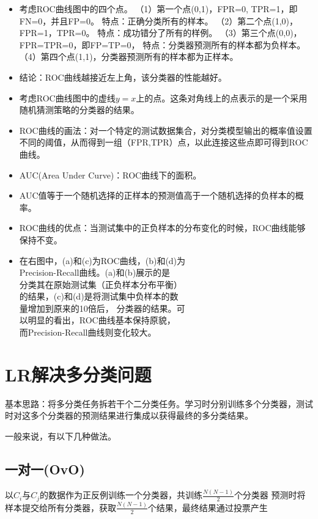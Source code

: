 \documentclass[10pt,a4paper]{ctexbook}
\begin{document}
\begin{itemize}

\item 考虑ROC曲线图中的四个点。
    \subitem（1）第一个点(0,1)，FPR=0, TPR=1，即FN=0，并且FP=0。
        \subsubitem 特点：正确分类所有的样本。
    \subitem（2）第二个点(1,0)，FPR=1，TPR=0。
        \subsubitem 特点：成功错分了所有的样例。
    \subitem（3）第三个点(0,0)，FPR=TPR=0，即FP=TP=0，
        \subsubitem 特点：分类器预测所有的样本都为负样本。
    \subitem（4）第四个点(1,1)，分类器预测所有的样本都为正样本。
\item 结论：ROC曲线越接近左上角，该分类器的性能越好。
\item 考虑ROC曲线图中的虚线$y=x$上的点。这条对角线上的点表示的是一个采用随机猜测策略的分类器的结果。

\item ROC曲线的画法：对一个特定的测试数据集合，对分类模型输出的概率值设置不同的阈值，从而得到一组（FPR,TPR）点，以此连接这些点即可得到ROC曲线。
\item AUC(Area Under Curve)：ROC曲线下的面积。
\item AUC值等于一个随机选择的正样本的预测值高于一个随机选择的负样本的概率。
\item ROC曲线的优点：当测试集中的正负样本的分布变化的时候，ROC曲线能够保持不变。

\item 在右图中，(a)和(c)为ROC曲线，(b)和(d)为\\
Precision-Recall曲线。(a)和(b)展示的是\\
分类其在原始测试集（正负样本分布平衡）\\
的结果，(c)和(d)是将测试集中负样本的数\\
量增加到原来的10倍后， 分类器的结果。可\\
以明显的看出，ROC曲线基本保持原貌，\\
而Precision-Recall曲线则变化较大。
\end{itemize}

\section{LR解决多分类问题}
基本思路：将多分类任务拆若干个二分类任务。学习时分别训练多个分类器，测试时对这多个分类器的预测结果进行集成以获得最终的多分类结果。

一般来说，有以下几种做法。

\subsection{一对一(OvO) }
以$C_{i}$与$C_{j}$的数据作为正反例训练一个分类器，共训练${\frac {N(N-1)}{2}}$个分类器
预测时将样本提交给所有分类器，获取${\frac {N(N-1)}{2}}$个结果，最终结果通过投票产生
\end{document}
